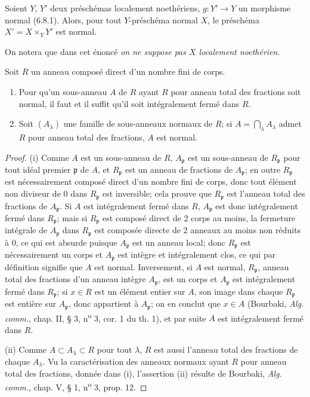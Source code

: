 \begin{proposition}[6.14.1]
Soient $Y$, $Y'$ deux préschémas localement noethériens,
$g:Y'\to Y$ un morphisme normal \textup{(6.8.1)}. Alors, pour tout $Y$-préschéma
normal $X$, le préschéma $X'=X\times_Y Y'$ est normal.
\end{proposition}

On notera que dans cet énoncé \emph{on ne suppose pas $X$ localement noethérien}.

\begin{lemma}[6.14.1.1]
\label{IV.2.s6.14.1.1-fr}
Soit $R$ un anneau composé direct d'un nombre fini de corps.
\begin{enumerate}
\item[\textup{(i)}] Pour qu'un sous-anneau $A$ de $R$ ayant $R$ pour anneau total
des fractions soit normal, il faut et il suffit qu'il soit intégralement
fermé dans $R$.
\item[\textup{(ii)}] Soit $(A_\lambda)$ une famille de sous-anneaux normaux de $R$;
si $A=\bigcap_\lambda A_\lambda$ admet $R$ pour anneau total des fractions,
$A$ est normal.
\end{enumerate}
\end{lemma}

\begin{proof}
(i) Comme $A$ est un sous-anneau de $R$, $A_\mathfrak p$ est un sous-anneau
de $R_\mathfrak p$ pour tout idéal premier $\mathfrak p$ de $A$, et
$R_\mathfrak p$ est un anneau de fractions de $A_\mathfrak p$; en outre
$R_\mathfrak p$ est nécessairement composé direct d'un nombre fini de
corps, donc tout élément non diviseur de $0$ dans $R_\mathfrak p$ est
inversible; cela prouve que $R_\mathfrak p$ est l'anneau total des fractions
de $A_\mathfrak p$. Si $A$ est intégralement fermé dans $R$,
$A_\mathfrak p$ est donc intégralement fermé dans $R_\mathfrak p$; mais si
$R_\mathfrak p$ est composé direct de 2 corps au moins, la fermeture
intégrale de $A_\mathfrak p$ dans $R_\mathfrak p$ est composée directe de
2 anneaux au moins non réduits à $0$, ce qui est absurde puisque
$A_\mathfrak p$ est un anneau local; donc $R_\mathfrak p$ est
nécessairement un corps et $A_\mathfrak p$ est intègre et intégralement clos,
ce qui par définition signifie que $A$ est normal. Inversement, si $A$ est
normal, $R_\mathfrak p$, anneau total des fractions d'un anneau intègre
$A_\mathfrak p$, est un corps et $A_\mathfrak p$ est intégralement fermé
dans $R_\mathfrak p$; si $x\in R$ est un élément entier sur $A$, son image
dans chaque $R_\mathfrak p$ est entière sur $A_\mathfrak p$, donc appartient
à $A_\mathfrak p$; on en conclut que $x\in A$ (Bourbaki, \emph{Alg. comm.}, chap.
II, § 3, n\textsuperscript{o} 3, cor. 1 du th. 1), et par suite $A$ est intégralement fermé
dans $R$.

(ii) Comme $A\subset A_\lambda\subset R$ pour tout $\lambda$, $R$ est aussi
l'anneau total des fractions de chaque $A_\lambda$. Vu la caractérisation
des anneaux normaux ayant $R$ pour anneau total des fractions, donnée dans
(i), l'assertion (ii) résulte de Bourbaki, \emph{Alg. comm.}, chap. V, § 1, n\textsuperscript{o}
3, prop. 12.
\end{proof}

